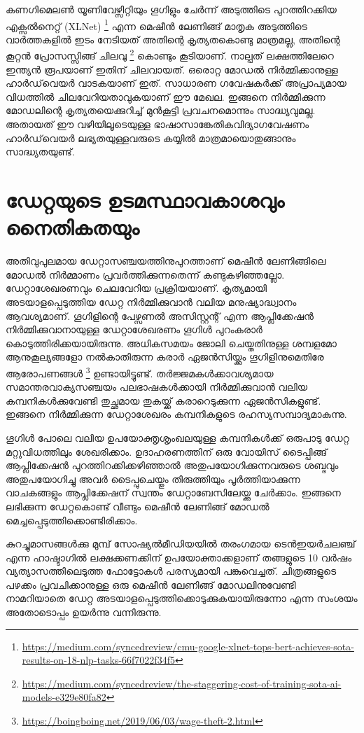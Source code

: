 \documentclass[12pt,twoside,a4paper]{article}
\begin{document}
കണഗിമെലൺ യൂണിവേഴ്സിറ്റിയും ഗൂഗിളും ചേർന്ന് അടുത്തിടെ പുറത്തിറക്കിയ എക്സൽനെറ്റ് (XLNet) \footnote{\url{https://medium.com/syncedreview/cmu-google-xlnet-tops-bert-achieves-sota-results-on-18-nlp-tasks-66f7022f34f5}} എന്ന മെഷീൻ ലേണിങ്ങ് മാതൃക അടുത്തിടെ വാർത്തകളിൽ ഇടം നേടിയത് അതിന്റെ കൃത്യതകൊണ്ടു മാത്രമല്ല, അതിന്റെ കൂറ്റൻ പ്രോസസ്സിങ്ങ്  ചിലവു \footnote{\url{https://medium.com/syncedreview/the-staggering-cost-of-training-sota-ai-models-e329e80fa82}} കൊണ്ടും കൂടിയാണ്. നാല്പത് ലക്ഷത്തിലേറെ ഇന്ത്യൻ രൂപയാണ് ഇതിന് ചിലവായത്. ഒരൊറ്റ മോഡൽ നിർമ്മിക്കാനുള്ള ഹാർഡ്‌വെയർ വാടകയാണ് ഇത്. സാധാരണ ഗവേഷകർക്ക് അപ്രാപ്യമായ വിധത്തിൽ ചിലവേറിയതാവുകയാണ് ഈ മേഖല. ഇങ്ങനെ നിർമ്മിക്കുന്ന മോഡലിന്റെ കൃത്യതയെക്കുറിച്ച് മുൻകൂട്ടി പ്രവചനമൊന്നും സാദ്ധ്യവുമല്ല. അതായത് ഈ വഴിയിലൂടെയുള്ള ഭാഷാസാങ്കേതികവിദ്യാഗവേഷണം ഹാർഡ്‌വെയർ ലഭ്യതയുള്ളവരുടെ കയ്യിൽ മാത്രമായൊതുങ്ങാനും സാദ്ധ്യതയുണ്ട്.


\section{ഡേറ്റയുടെ ഉടമസ്ഥാവകാശവും നൈതികതയും}

അതിവുപുലമായ ഡേറ്റാസഞ്ചയത്തിനുപുറത്താണ്  മെഷീൻ ലേണിങ്ങിലെ മോഡൽ നിർമ്മാണം പ്രവർത്തിക്കുന്നതെന്ന് കണ്ടുകഴിഞ്ഞല്ലോ. ഡേറ്റാശേഖരണവും ചെലവേറിയ പ്രക്രിയയാണ്. കൃത്യമായി അടയാളപ്പെടുത്തിയ ഡേറ്റ നിർമ്മിക്കുവാൻ വലിയ മനുഷ്യാദ്ധ്വാനം ആവശ്യമാണ്. ഗൂഗിളിന്റെ പേഴ്സണൽ അസിസ്റ്റന്റ് എന്ന ആപ്ലിക്കേഷൻ നിർമ്മിക്കുവാനായുള്ള ഡേറ്റാശേഖരണം ഗൂഗിൾ പുറംകരാർ കൊടുത്തിരിക്കയായിരുന്നു. അധികസമയം ജോലി ചെയ്തതിനുള്ള ശമ്പളമോ ആനുകൂല്യങ്ങളോ നൽകാതിരുന്ന കരാർ ഏജൻസിയ്ക്കും ഗൂഗിളിനുമെതിരേ ആരോപണങ്ങൾ \footnote{\url{https://boingboing.net/2019/06/03/wage-theft-2.html}} ഉണ്ടായിട്ടുണ്ട്. തർജ്ജമകൾക്കാവശ്യമായ സമാന്തരവാക്യസഞ്ചയം പലഭാഷകൾക്കായി നിർമ്മിക്കുവാൻ  വലിയ കമ്പനികൾക്കുവേണ്ടി  തുച്ഛമായ തുകയ്ക്ക് കരാറെടുക്കുന്ന ഏജൻസികളുണ്ട്. ഇങ്ങനെ നിർമ്മിക്കുന്ന ഡേറ്റാശേഖരം കമ്പനികളുടെ രഹസ്യസമ്പാദ്യമാകുന്നു.

ഗൂഗിൾ പോലെ വലിയ ഉപയോക്തൃശൃംഖലയുള്ള‌ കമ്പനികൾക്ക് ഒരുപാടു ഡേറ്റ മറ്റുവിധത്തിലും ശേഖരിക്കാം. ഉദാഹരണത്തിന് ഒരു വോയിസ് ടൈപ്പിങ്ങ് ആപ്ലിക്കേഷൻ പുറത്തിറക്കിക്കഴിഞ്ഞാൽ അതുപയോഗിക്കുന്നവരുടെ ശബ്ദവും അതുപയോഗിച്ചു അവർ ടൈപ്പുചെയ്തും തിരുത്തിയും പൂർത്തിയാക്കുന്ന വാചകങ്ങളും ആപ്ലിക്കേഷന് സ്വന്തം ഡേറ്റാബേസിലേയ്ക്കു ചേർക്കാം. ഇങ്ങനെ ലഭിക്കുന്ന ഡേറ്റകൊണ്ട് വീണ്ടും മെഷീൻ ലേണിങ്ങ് മോഡൽ മെച്ചപ്പെടുത്തിക്കൊണ്ടിരിക്കാം.

കുറച്ചുമാസങ്ങൾക്കു മുമ്പ് സോഷ്യൽമീഡിയയിൽ തരംഗമായ ടെൻഇയർചലഞ്ച് എന്ന ഹാഷ്ടാഗിൽ ലക്ഷക്കണക്കിന് ഉപയോക്താക്കളാണ് തങ്ങളുടെ 10 വർഷം വ്യത്യാസത്തിലെടുത്ത ഫോട്ടോകൾ പരസ്യമായി പങ്കുവെച്ചത്. ചിത്രങ്ങളുടെ പഴക്കം പ്രവചിക്കാനുള്ള ഒരു മെഷീൻ ലേണിങ്ങ് മോഡലിനുവേണ്ടി നാമറിയാതെ ഡേറ്റ അടയാളപ്പെടുത്തിക്കൊടുക്കുകയായിരുന്നോ എന്ന സംശയം അതോടൊപ്പം ഉയർന്നു വന്നിരുന്നു.
\end{document}
